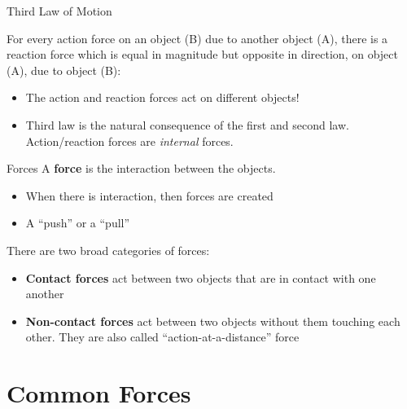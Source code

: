 \documentclass[12pt,compress,aspectratio=169]{beamer}
\begin{document}
\begin{frame}{Third Law of Motion}
  \begin{center}
  \end{center}

  For every action force on an object (B) due to another object (A), there is a
  reaction force which is equal in magnitude but opposite in direction, on
  object (A), due to object (B):

  \begin{itemize}
  \item The action and reaction forces act on different objects!
  \item Third law is the natural consequence of the first and second law.
    Action/reaction forces are \emph{internal} forces.
  \end{itemize}
  \vspace{.2in}
\end{frame}



\begin{frame}{Forces}
  A \textbf{force} is the interaction between the objects.
  \begin{itemize}
  \item When there is interaction, then forces are created
  \item A ``push'' or a ``pull''
  \end{itemize}
  There are two broad categories of forces:
  \begin{itemize}
  \item\textbf{Contact forces} act between two objects that are in contact
    with one another
  \item\textbf{Non-contact forces} act between two objects without them
    touching each other. They are also called ``action-at-a-distance'' force
  \end{itemize}
\end{frame}



\section{Common Forces}
\end{document}
